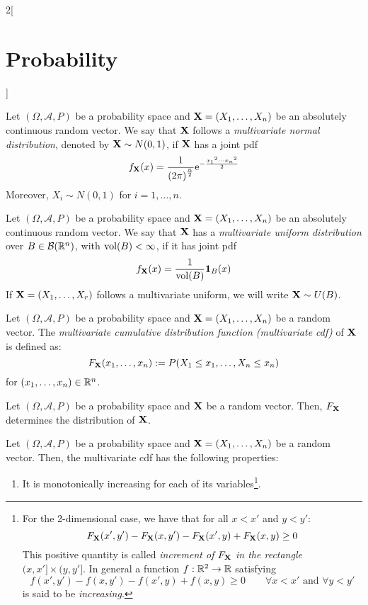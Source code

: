 \documentclass[../../../main.tex]{subfiles}
\begin{document}
\begin{multicols}{2}[\section{Probability}]
\begin{prop}
  \end{prop}
  \begin{definition}
    Let $(\Omega,\mathcal{A},P)$ be a probability space and $\boldsymbol{\mathrm{X}}=(X_1,\ldots,X_n)$ be an absolutely continuous random vector. We say that $\boldsymbol{\mathrm{X}}$ follows a \textit{multivariate normal distribution}, denoted by $\boldsymbol{\mathrm{X}}\sim N(0,1)$, if $\boldsymbol{\mathrm{X}}$ has a joint pdf $$f_{\boldsymbol{\mathrm{X}}}(x)=\frac{1}{{(2\pi)}^{\frac{n}{2}}}\mathrm{e}^{-\frac{{x_1}^2\cdots{x_n}^2}{2}}$$ Moreover, $X_i\sim N(0,1)$ for $i=1,\ldots,n$.
  \end{definition}
  \begin{definition}
    Let $(\Omega,\mathcal{A},P)$ be a probability space and $\boldsymbol{\mathrm{X}}=(X_1,\ldots,X_n)$ be an absolutely continuous random vector. We say that $\boldsymbol{\mathrm{X}}$ has a \textit{multivariate uniform distribution} over $B\in\mathcal{B}(\mathbb{R}^n)$, with $\operatorname{vol}(B)<\infty$, if it has joint pdf $$f_{\boldsymbol{\mathrm{X}}}(x)=\frac{1}{\operatorname{vol}(B)}\boldsymbol{\mathrm{1}}_B(x)$$ If $\boldsymbol{\mathrm{X}}=(X_1,\ldots,X_r)$ follows a multivariate uniform, we will write $\boldsymbol{\mathrm{X}}\sim U(B)$.
  \end{definition}
  \begin{definition}
    Let $(\Omega,\mathcal{A},P)$ be a probability space and $\boldsymbol{\mathrm{X}}=(X_1,\ldots,X_n)$ be a random vector. The \textit{multivariate cumulative distribution function (multivariate cdf)} of $\boldsymbol{\mathrm{X}}$ is defined as: $$F_{\boldsymbol{\mathrm{X}}}(x_1,\ldots,x_n):=P(X_1\leq x_1,\ldots,X_n\leq x_n)$$ for $(x_1,\ldots,x_n)\in\mathbb{R}^n$.
  \end{definition}
  \begin{theorem}
    Let $(\Omega,\mathcal{A},P)$ be a probability space and $\boldsymbol{\mathrm{X}}$ be a random vector. Then, $F_{\boldsymbol{\mathrm{X}}}$ determines the distribution of $\boldsymbol{\mathrm{X}}$.
  \end{theorem}
  \begin{prop}
    Let $(\Omega,\mathcal{A},P)$ be a probability space and $\boldsymbol{\mathrm{X}}=(X_1,\ldots,X_n)$ be a random vector. Then, the multivariate cdf has the following properties:
    \begin{enumerate}
      \item It is monotonically increasing for each of its variables\footnote{For the 2-dimensional case, we have that for all $x<x'$ and $y<y'$: $$F_{\boldsymbol{\mathrm{X}}}(x',y')-F_{\boldsymbol{\mathrm{X}}}(x,y')-F_{\boldsymbol{\mathrm{X}}}(x',y)+F_{\boldsymbol{\mathrm{X}}}(x,y)\geq 0$$ This positive quantity is called \textit{increment of $F_{\boldsymbol{\mathrm{X}}}$ in the rectangle $(x,x']\times(y,y']$}. In general a function $f:\mathbb{R}^2\rightarrow\mathbb{R}$ satisfying $$f(x',y')-f(x,y')-f(x',y)+f(x,y)\geq 0\qquad\forall x<x'\text{ and }\forall y<y'$$ is said to be \textit{increasing}.}.

\end{enumerate}
\end{prop}
\end{multicols}
\end{document}

